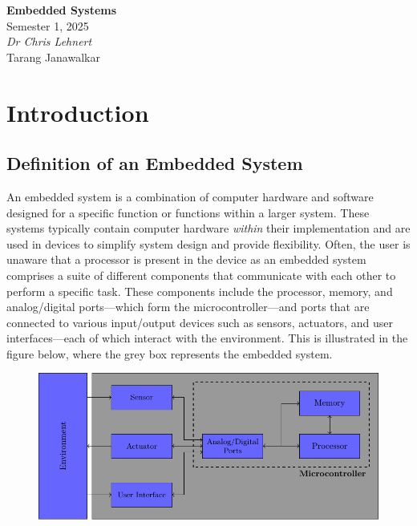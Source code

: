 \documentclass{article}
\date{}
\newcommand{\unitName}{Embedded Systems}
\newcommand{\unitTime}{Semester 1, 2025}
\newcommand{\unitCoordinator}{Dr Chris Lehnert}
\newcommand{\documentAuthors}{Tarang Janawalkar}
\begin{document}
%
\begin{titlepage}
    \vspace*{\fill}
    \begin{center}
        \LARGE{\textbf{\unitName}} \\[0.1in]
        \normalsize{\unitTime} \\[0.2in]
        \normalsize\textit{\unitCoordinator} \\[0.2in]
        \documentAuthors
    \end{center}
    \vspace*{\fill}
    \doclicenseThis
    \thispagestyle{empty}
\end{titlepage}
\newpage
%
\tableofcontents
\newpage
%
\section{Introduction}
\subsection{Definition of an Embedded System}
An embedded system is a combination of computer hardware and software
designed for a specific function or functions within a larger system.
These systems typically contain computer hardware \textit{within} their
implementation and are used in devices to simplify system design and
provide flexibility. Often, the user is unaware that a processor is
present in the device as an embedded system comprises a suite of
different components that communicate with each other to perform a
specific task. These components include the processor, memory, and
analog/digital ports---which form the microcontroller---and ports that
are connected to various input/output devices such as sensors,
actuators, and user interfaces---each of which interact with the
environment. This is illustrated in the figure below, where the grey
box represents the embedded system.
\begin{figure}[H]
    \centering
    \includegraphics[width = \linewidth]{figures/embedded_system_structure.pdf}
\end{figure}
\end{document}
